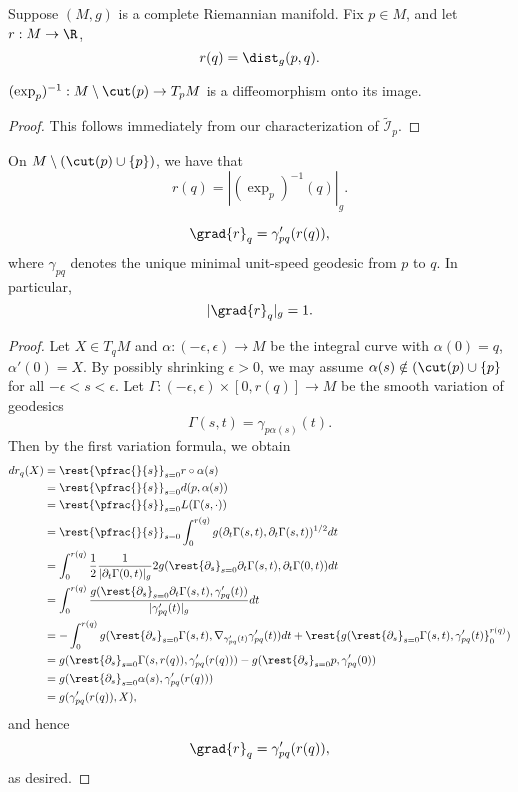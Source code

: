 Suppose $(M,g)$ is a complete Riemannian manifold.  Fix $p\in M$, and let $r:M\to\R$,
$$r(q)=\dist_g(p,q).$$

\begin{lem}
    $(\exp_p)^{-1}:M\setminus\cut(p)\to T_pM$ is a diffeomorphism onto its image.
\end{lem}

\begin{proof}
This follows immediately from our characterization of $\tilde{\mathcal{I}}_p$.
\end{proof}

On $M\setminus(\cut(p)\cup\{p\})$, we have that
$$r(q)=|(\exp_p)^{-1}(q)|_g.$$





\begin{thm}
    $$\grad{r}_q=\gamma_{pq}'(r(q)),$$
    where $\gamma_{pq}$ denotes the unique minimal unit-speed geodesic from $p$ to $q$.  In particular,
    $$|\grad{r}_q|_g=1.$$
\end{thm}
\begin{proof}
Let $X\in T_qM$ and $\alpha:(-\epsilon,\epsilon)\to M$ be the integral curve with $\alpha(0)=q$, $\alpha'(0)=X$.  By possibly shrinking $\epsilon>0$, we may assume $\alpha(s)\notin(\cut(p)\cup\{p\}$ for all $-\epsilon<s<\epsilon$.  Let $\Gamma:(-\epsilon,\epsilon)\times[0,r(q)]\to M$ be the smooth variation of geodesics
$$\Gamma(s,t)=\gamma_{p\alpha(s)}(t).$$
Then by the first variation formula, we obtain
\begin{align*}
	dr_q(X)&=\rest{\pfrac{}{s}}_{s=0}r\circ\alpha(s)\\
	&=\rest{\pfrac{}{s}}_{s=0}d(p,\alpha(s))\\
	&=\rest{\pfrac{}{s}}_{s=0}L(\Gamma(s,\cdot))\\
	&=\rest{\pfrac{}{s}}_{s=0}\int_0^{r(q)}g(\partial_t\Gamma(s,t),\partial_t\Gamma(s,t))^{1/2}dt\\
	&=\int_0^{r(q)}\frac{1}{2}\frac{1}{|\partial_t\Gamma(0,t)|_g}2g(\rest{\partial_s}_{s=0}\partial_t\Gamma(s,t),\partial_t\Gamma(0,t))dt\\
	&=\int_0^{r(q)}\frac{g(\rest{\partial_s}_{s=0}\partial_t\Gamma(s,t),\gamma_{pq}'(t))}{|\gamma_{pq}'(t)|_g}dt\\
	&=-\int_0^{r(q)}g(\rest{\partial_s}_{s=0}\Gamma(s,t),\nabla_{\gamma_{pq}'(t)}\gamma_{pq}'(t))dt+\rest{g(\rest{\partial_s}_{s=0}\Gamma(s,t),\gamma_{pq}'(t)}_0^{r(q)})\\
	&=g(\rest{\partial_s}_{s=0}\Gamma(s,r(q)),\gamma_{pq}'(r(q)))-g(\rest{\partial_s}_{s=0}p,\gamma_{pq}'(0))\\
	&=g(\rest{\partial_s}_{s=0}\alpha(s),\gamma_{pq}'(r(q)))\\
	&=g(\gamma_{pq}'(r(q)),X),
\end{align*}
and hence
$$\grad{r}_q=\gamma_{pq}'(r(q)),$$
as desired.
\end{proof}

